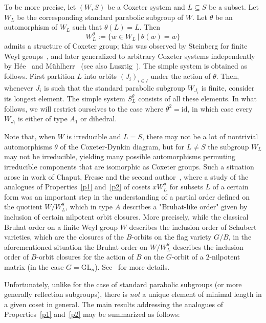 \documentclass[11pt]{article}
\theoremstyle{definition}
\numberwithin{equation}{section}
\begin{document}
To be more precise, let $(W,S)$ be a Coxeter system and $L\subseteq S$ be a subset. Let $W_L$ be the corresponding standard parabolic subgroup of $W$. Let $\theta$ be an automorphism of $W_L$ such that $\theta(L)=L$. Then $$W_L^\theta:=\{w\in W_L \ \vert \ \theta(w)=w\}$$ admits a structure of Coxeter group; this was observed by Steinberg for finite Weyl groups~\cite[Section 11]{Steinberg}, and later generalized to arbitrary Coxeter systems independently by Hée~\cite{Hee_1} and Mühlherr~\cite{muhlh} (see also Lusztig~\cite[Appendix]{Lus_book}). The simple system is obtained as follows. First partition $L$ into orbits $(J_i)_{i\in I}$ under the action of $\theta$. Then, whenever $J_i$ is such that the standard parabolic subgroup $W_{J_i}$ is finite, consider its longest element. The simple system $S_L^\theta$ consists of all these elements. In what follows, we will restrict ourselves to the case where $\theta^2=\mathrm{id}$, in which case every $W_{J_i}$ is either of type $A_1$ or dihedral.  

Note that, when $W$ is irreducible and $L=S$, there may not be a lot of nontrivial automorphisms $\theta$ of the Coxeter-Dynkin diagram, but for $L\neq S$ the subgroup $W_L$ may not be irreducible, yielding many possible automorphisms permuting irreducible components that are isomorphic as Coxeter groups. Such a situation arose in work of Chaput, Fresse and the second author~\cite[Section 3]{CFG}, where a study of the analogues of Properties~\ref{p1} and~\ref{p2} of cosets $x W_L^\theta$ for subsets $L$ of a certain form was an important step in the understanding of a partial order defined on the quotient $W/W_L^\theta$, which in type $A$ describes a "Bruhat-like order" given by inclusion of certain nilpotent orbit closures. More precisely, while the classical Bruhat order on a finite Weyl group $W$ describes the inclusion order of Schubert varieties, which are the closures of the $B$-orbits on the flag variety $G/B$, in the aforementioned situation the Bruhat order on $W/W_L^\theta$ describes the inclusion order of $B$-orbit closures for the action of $B$ on the $G$-orbit of a $2$-nilpotent matrix (in the case $G=\mathrm{GL}_n$). See~\cite[Theorem 9.1]{CFG} for more details.   

Unfortunately, unlike for the case of standard parabolic subgroups (or more generally reflection subgroups), there is \textit{not} a unique element of minimal length in a given coset in general. The main results addressing the analogues of Properties~\ref{p1} and~\ref{p2} may be summarized as follows: 
\end{document}
